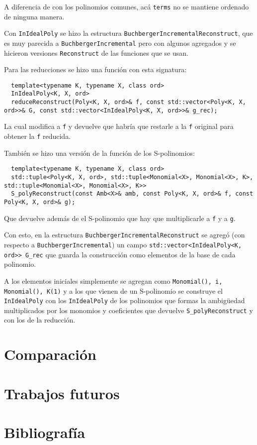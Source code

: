 \documentclass[12pt]{report}
\theoremstyle{customstyle}
\theoremstyle{factstyle}
\begin{document}
A diferencia de con los polinomios comunes, acá \texttt{terms} no se mantiene ordenado de ninguna manera.

Con \texttt{InIdealPoly} se hizo la estructura \texttt{BuchbergerIncrementalReconstruct}, que es muy parecida a \texttt{BuchbergerIncremental} pero con algunos agregados y se hicieron versiones \texttt{Reconstruct} de las funciones que se usan.

Para las reducciones se hizo una función con esta signatura:

\begin{verbatim}
  template<typename K, typename X, class ord>
  InIdealPoly<K, X, ord>
  reduceReconstruct(Poly<K, X, ord>& f, const std::vector<Poly<K, X, ord>>& G, const std::vector<InIdealPoly<K, X, ord>>& g_rec);
\end{verbatim}

La cual modifica a \texttt{f} y devuelve que habría que restarle a la \texttt{f} original para obtener la \texttt{f} reducida.

También se hizo una versión de la función de los S-polinomios:

\begin{verbatim}
  template<typename K, typename X, class ord>
  std::tuple<Poly<K, X, ord>, std::tuple<Monomial<X>, Monomial<X>, K>, std::tuple<Monomial<X>, Monomial<X>, K>>
  S_polyReconstruct(const Amb<X>& amb, const Poly<K, X, ord>& f, const Poly<K, X, ord>& g);
\end{verbatim}

Que devuelve además de el S-polinomio que hay que multiplicarle a \texttt{f} y a \texttt{g}.

Con esto, en la estructura \texttt{BuchbergerIncrementalReconstruct} se agregó (con respecto a \texttt{BuchbergerIncremental}) un campo \texttt{std::vector<InIdealPoly<K, ord>> G\_rec} que guarda la construcción como elementos de la base de cada polinomio.

A los elementos iniciales simplemente se agregan como \texttt{{Monomial(), i, Monomial(), K(1)}} y a los que vienen de un S-polinomio se construye el \texttt{InIdealPoly} con los \texttt{InIdealPoly} de los polinomios que formas la ambigüedad multiplicados por los monomios y coeficientes que devuelve \texttt{S\_polyReconstruct} y con los de la reducción.

\chapter{Comparación}


\chapter{Trabajos futuros}\label{cap:trabajos futuros}


\chapter{Bibliografía}

\printbibliography[heading=none]
\end{document}
